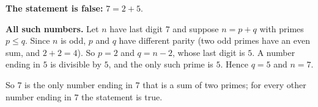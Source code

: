 \textbf{The statement is false:} $7=2+5$.

\textbf{All such numbers.} Let $n$ have last digit $7$ and suppose $n=p+q$ with primes $p\le q$. Since $n$ is odd, $p$ and $q$ have different parity (two odd primes have an even sum, and $2+2=4$). So $p=2$ and $q=n-2$, whose last digit is $5$. A number ending in $5$ is divisible by $5$, and the only such prime is $5$. Hence $q=5$ and $n=7$.

So $\boxed{7}$ is the only number ending in $7$ that is a sum of two primes; for every other number ending in $7$ the statement is true.
